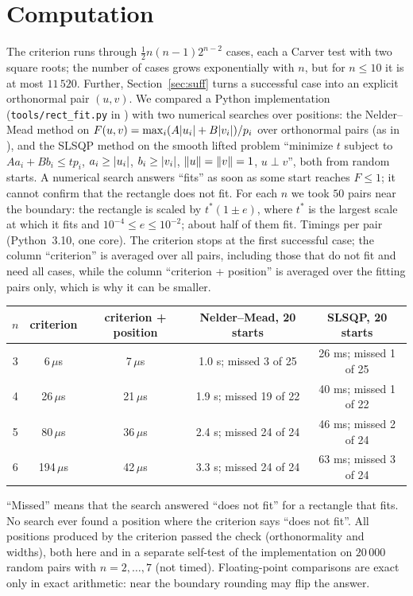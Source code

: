 \documentclass[11pt]{article}
\theoremstyle{definition}
\theoremstyle{remark}
\DeclarePairedDelimiter{\abs}{\lvert}{\rvert}
\DeclarePairedDelimiter{\norm}{\lVert}{\rVert}
\begin{document}
\section{Computation}\label{sec:comp}

The criterion runs through $\tfrac12n(n-1)2^{n-2}$ cases, each a Carver test with two square roots; the
number of cases grows exponentially with $n$, but for $n\le10$ it is at most $11\,520$. Further,
Section~\ref{sec:suff} turns a successful case into an explicit orthonormal pair $(u,v)$. We compared a Python
implementation (\texttt{tools/rect\_fit.py} in \cite{Repo}) with two numerical searches over positions: the
Nelder--Mead method on $F(u,v)=\max_i(A\abs{u_i}+B\abs{v_i})/p_i$ over orthonormal pairs (as in
\cite{Levit2026}), and the SLSQP method on the smooth lifted problem ``minimize $t$ subject to
$A a_i+Bb_i\le tp_i$, $a_i\ge\abs{u_i}$, $b_i\ge\abs{v_i}$, $\norm u=\norm v=1$, $u\perp v$'', both from random starts.
A numerical search answers ``fits'' as soon as some start reaches $F\le1$; it cannot confirm that the rectangle does
not fit. For each $n$ we took $50$ pairs near the boundary: the rectangle is scaled by $t^*(1\pm e)$, where $t^*$ is
the largest scale at which it fits and $10^{-4}\le e\le10^{-2}$; about half of them fit. Timings per pair
(Python~3.10, one core). The criterion stops at the first successful case; the column ``criterion'' is
averaged over all pairs, including those that do not fit and need all cases, while the column
``criterion + position'' is averaged over the fitting pairs only, which is why it can be smaller.

\begin{center}
\begin{tabular}{ccccc}
\toprule
$n$ & criterion & criterion + position & Nelder--Mead, 20 starts & SLSQP, 20 starts\\
\midrule
3 & 6\,$\mu$s & 7\,$\mu$s & 1.0 s; missed 3 of 25 & 26 ms; missed 1 of 25\\
4 & 26\,$\mu$s & 21\,$\mu$s & 1.9 s; missed 19 of 22 & 40 ms; missed 1 of 22\\
5 & 80\,$\mu$s & 36\,$\mu$s & 2.4 s; missed 24 of 24 & 46 ms; missed 2 of 24\\
6 & 194\,$\mu$s & 42\,$\mu$s & 3.3 s; missed 24 of 24 & 63 ms; missed 3 of 24\\
\bottomrule
\end{tabular}
\end{center}

\noindent ``Missed'' means that the search answered ``does not fit'' for a rectangle that fits. No search ever found a
position where the criterion says ``does not fit''. All positions produced by the criterion passed the check (orthonormality and widths), both here and in a
separate self-test of the implementation on $20\,000$ random pairs with $n=2,\dots,7$ (not timed). Floating-point comparisons are
exact only in exact arithmetic: near the boundary rounding may flip the answer.
\end{document}
